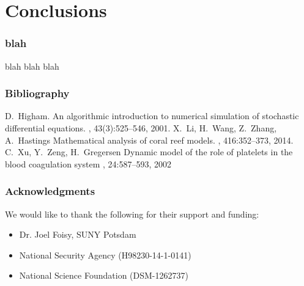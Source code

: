 
\section{Conclusions}


\begin{frame}
  \frametitle{blah}

  blah blah blah

\end{frame}


\begin{frame}
  \frametitle{Bibliography}

 \begin{thebibliography}{1}

   D.~Higham.
   \newblock An algorithmic introduction to numerical simulation of stochastic
   differential equations.
   , 43(3):525--546, 2001.
   X.~Li, H.~Wang, Z.~Zhang, A.~Hastings
   \newblock Mathematical analysis of coral reef models.
   , 416:352--373, 2014.
   C.~Xu, Y.~Zeng, H.~Gregersen
   \newblock Dynamic model of the role of platelets in the blood coagulation system
   , 24:587--593, 2002

  \end{thebibliography}
  
\end{frame}

\begin{frame}
  \frametitle{Acknowledgments}
  
  We would like to thank the following for their support and funding: 
  
 \begin{itemize}
 \item Dr. Joel Foisy, SUNY Potsdam
 \item National Security Agency (H98230-14-1-0141)
 \item National Science Foundation (DSM-1262737)
 \end{itemize}
\end{frame}


